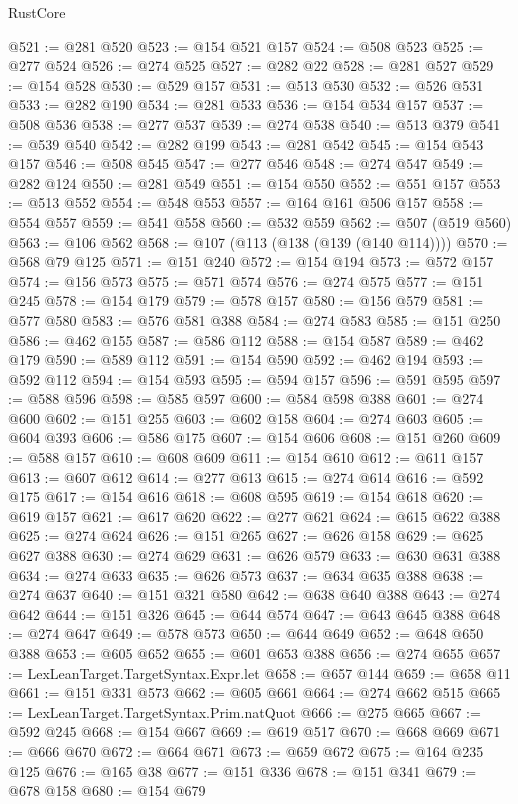 \begin{lexlean}{RustCore}
\begin{coremodule}
@521 := @281 @520
@523 := @154 @521 @157
@524 := @508 @523
@525 := @277 @524
@526 := @274 @525
@527 := @282 @22
@528 := @281 @527
@529 := @154 @528
@530 := @529 @157
@531 := @513 @530
@532 := @526 @531
@533 := @282 @190
@534 := @281 @533
@536 := @154 @534 @157
@537 := @508 @536
@538 := @277 @537
@539 := @274 @538
@540 := @513 @379
@541 := @539 @540
@542 := @282 @199
@543 := @281 @542
@545 := @154 @543 @157
@546 := @508 @545
@547 := @277 @546
@548 := @274 @547
@549 := @282 @124
@550 := @281 @549
@551 := @154 @550
@552 := @551 @157
@553 := @513 @552
@554 := @548 @553
@557 := @164 @161 @506 @157
@558 := @554 @557
@559 := @541 @558
@560 := @532 @559
@562 := @507 (@519 @560)
@563 := @106 @562
@568 := @107 (@113 (@138 (@139 (@140 @114))))
@570 := @568 @79 @125
@571 := @151 @240
@572 := @154 @194
@573 := @572 @157
@574 := @156 @573
@575 := @571 @574
@576 := @274 @575
@577 := @151 @245
@578 := @154 @179
@579 := @578 @157
@580 := @156 @579
@581 := @577 @580
@583 := @576 @581 @388
@584 := @274 @583
@585 := @151 @250
@586 := @462 @155
@587 := @586 @112
@588 := @154 @587
@589 := @462 @179
@590 := @589 @112
@591 := @154 @590
@592 := @462 @194
@593 := @592 @112
@594 := @154 @593
@595 := @594 @157
@596 := @591 @595
@597 := @588 @596
@598 := @585 @597
@600 := @584 @598 @388
@601 := @274 @600
@602 := @151 @255
@603 := @602 @158
@604 := @274 @603
@605 := @604 @393
@606 := @586 @175
@607 := @154 @606
@608 := @151 @260
@609 := @588 @157
@610 := @608 @609
@611 := @154 @610
@612 := @611 @157
@613 := @607 @612
@614 := @277 @613
@615 := @274 @614
@616 := @592 @175
@617 := @154 @616
@618 := @608 @595
@619 := @154 @618
@620 := @619 @157
@621 := @617 @620
@622 := @277 @621
@624 := @615 @622 @388
@625 := @274 @624
@626 := @151 @265
@627 := @626 @158
@629 := @625 @627 @388
@630 := @274 @629
@631 := @626 @579
@633 := @630 @631 @388
@634 := @274 @633
@635 := @626 @573
@637 := @634 @635 @388
@638 := @274 @637
@640 := @151 @321 @580
@642 := @638 @640 @388
@643 := @274 @642
@644 := @151 @326
@645 := @644 @574
@647 := @643 @645 @388
@648 := @274 @647
@649 := @578 @573
@650 := @644 @649
@652 := @648 @650 @388
@653 := @605 @652
@655 := @601 @653 @388
@656 := @274 @655
@657 := LexLeanTarget.TargetSyntax.Expr.let
@658 := @657 @144
@659 := @658 @11
@661 := @151 @331 @573
@662 := @605 @661
@664 := @274 @662 @515
@665 := LexLeanTarget.TargetSyntax.Prim.natQuot
@666 := @275 @665
@667 := @592 @245
@668 := @154 @667
@669 := @619 @517
@670 := @668 @669
@671 := @666 @670
@672 := @664 @671
@673 := @659 @672
@675 := @164 @235 @125
@676 := @165 @38
@677 := @151 @336
@678 := @151 @341
@679 := @678 @158
@680 := @154 @679

\end{coremodule}
\end{lexlean}

